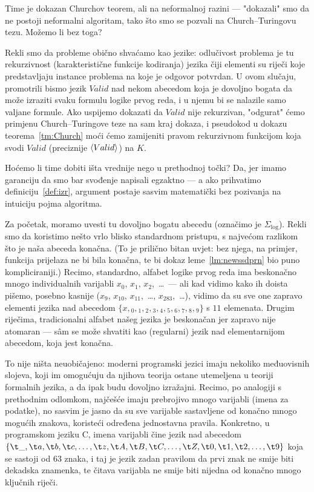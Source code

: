 Time je dokazan Churchov teorem, ali na neformalnoj razini --- "dokazali" smo da ne postoji neformalni algoritam, tako što smo se pozvali na Church--\!Turingovu tezu. Možemo li bez toga?

Rekli smo da probleme obično shvaćamo kao jezike: odlučivost problema je tu rekurzivnost (karakteristične funkcije kodiranja) jezika čiji elementi su riječi koje predstavljaju instance problema na koje je odgovor potvrdan. U ovom slučaju, promotrili bismo jezik $Valid$ nad nekom abecedom koja je dovoljno bogata da može izraziti svaku formulu logike prvog reda, i u njemu bi se nalazile samo valjane formule. Ako uspijemo dokazati da $Valid$ nije rekurzivan, "odgurat" ćemo primjenu Church--\!Turingove teze na sam kraj dokaza, i pseudokod u dokazu teorema~\ref{tm:Church} moći ćemo zamijeniti pravom rekurzivnom funkcijom koja svodi $Valid$ (preciznije $\langle Valid\rangle$) na $K$.

Hoćemo li time dobiti išta vrednije nego u prethodnoj točki? Da, jer imamo garanciju da smo bar svođenje napisali egzaktno --- a ako prihvatimo definiciju~\ref{def:izr}, argument postaje sasvim matematički bez pozivanja na intuiciju pojma algoritma.

Za početak, moramo uvesti tu dovoljno bogatu abecedu (označimo je $\Sigma_{\log}$). Rekli smo da koristimo nešto vrlo blisko standardnom pristupu, s najvećom razlikom što je naša abeceda konačna. (To je prilično bitan uvjet: bez njega, na primjer, funkcija prijelaza ne bi bila konačna, te bi dokaz leme~\ref{lm:newssdprn} bio puno kompliciraniji.) Recimo, standardno, alfabet logike prvog reda ima beskonačno mnogo individualnih varijabli $x_0$, $x_1$, $x_2$,~\ldots\ --- ali kad vidimo kako ih doista pišemo, posebno kasnije ($x_9$, $x_{10}$, $x_{11}$,~\ldots, $x_{283}$,~\ldots), vidimo da su sve one zapravo elementi jezika nad abecedom $\{x,{}_0,{}_1,{}_2,{}_3,{}_4,{}_5,{}_6,{}_7,{}_8,{}_9\}$ s $11$ elemenata. Drugim riječima, tradicionalni alfabet našeg jezika je beskonačan jer zapravo nije atomaran --- sâm se može shvatiti kao (regularni) jezik nad elementarnijom abecedom, koja jest konačna.

To nije ništa neuobičajeno: moderni programski jezici imaju nekoliko međuovisnih slojeva, koji im omogućuju da njihova teorija ostane utemeljena u teoriji formalnih jezika, a da ipak budu dovoljno izražajni. Recimo, po analogiji s prethodnim odlomkom, najčešće imaju prebrojivo mnogo varijabli (imena za podatke), no sasvim je jasno da su sve varijable sastavljene od konačno mnogo mogućih znakova, koristeći određena jednostavna pravila. Konkretno, u programskom jeziku C, imena varijabli čine jezik nad abecedom
$\{\t\_,\t a,\t b,\t c,\dotsc,\t z,\t A,\t B,\t C,\dotsc,\t Z,\t 0,\t 1,\t 2,\dotsc,\t 9\}$ koja se sastoji od $63$ znaka, i taj je jezik zadan pravilom da prvi znak ne smije biti dekadska znamenka, te čitava varijabla ne smije biti nijedna od konačno mnogo ključnih riječi.

